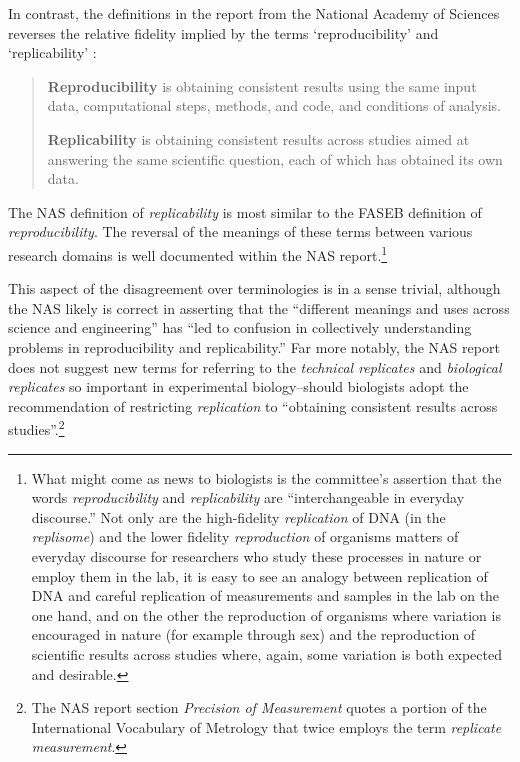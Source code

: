  In contrast, the definitions in the report from the National Academy of Sciences reverses the relative
	 fidelity implied by the terms `reproducibility' and `replicability' \cite[p.4]{committeeonreproducibilityandreplicabilityinscience2019reproducibility}: 
\begin{quote}
	\textbf{Reproducibility} is obtaining consistent results using the same input data, computational
	steps, methods, and code, and conditions of analysis.  \medskip

	\textbf{Replicability} is obtaining consistent results across studies aimed at answering the same
	scientific question, each of which has obtained its own data.
\end{quote}
      
The NAS definition of \emph{replicability} is most similar to the FASEB definition of \emph{reproducibility}.
The reversal of the meanings of these terms between various research domains is well documented within the NAS report.\footnote{
	What might come as news to biologists is the committee's assertion that the words \emph{reproducibility} and \emph{replicability} are 
		``interchangeable in everyday discourse.''
	Not only are the high-fidelity \emph{replication} of DNA (in the \emph{replisome}) and the lower fidelity \emph{reproduction}
		of organisms matters of everyday discourse for researchers who study these processes in nature or employ them in the lab,
		it is easy to see an analogy between replication of DNA and careful replication of measurements and samples
		in the lab on the one hand, and on the other the reproduction of organisms where variation is encouraged in nature
		(for example through sex) and the reproduction of scientific results across studies where, again, some variation is both 
		expected and desirable.}

This aspect of the disagreement over terminologies is in a sense trivial, although the NAS likely is correct in  
	asserting that the ``different meanings and uses across science and engineering'' has ``led to confusion in collectively 
	understanding problems in reproducibility and replicability.''
Far more notably, the NAS report does not suggest new terms for referring to the \emph{technical replicates} 
	and  \emph{biological replicates} so important in experimental biology--should biologists adopt the recommendation 
	of restricting \emph{replication} to ``obtaining consistent results across studies''.\footnote{
		The NAS report section \emph{Precision of Measurement} quotes a portion of the International Vocabulary of
		Metrology that twice employs the term \emph{replicate measurement}.
	}

